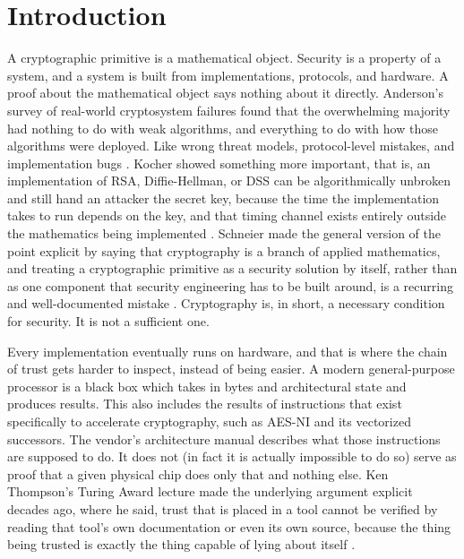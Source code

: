 \documentclass[11pt]{article}
\begin{document}
\newpage

\tableofcontents

\newpage

\section{Introduction}

A cryptographic primitive is a mathematical object. Security is a
property of a system, and a system is built from implementations,
protocols, and hardware. A proof about the mathematical object says
nothing about it directly. Anderson's survey of real-world cryptosystem
failures found that the overwhelming majority had nothing to do with weak
algorithms, and everything to do with how those algorithms were deployed.
Like wrong threat models, protocol-level mistakes, and implementation bugs
\cite{anderson1993}. Kocher showed something more important, that is, an
implementation of RSA, Diffie-Hellman, or DSS can be algorithmically
unbroken and still hand an attacker the secret key, because the time the
implementation takes to run depends on the key, and that timing channel
exists entirely outside the mathematics being implemented
\cite{kocher1996}. Schneier made the general version of the point
explicit by saying that cryptography is a branch of applied mathematics, and treating a
cryptographic primitive as a security solution by itself, rather than as
one component that security engineering has to be built around, is a
recurring and well-documented mistake \cite{schneier1998}. Cryptography
is, in short, a necessary condition for security. It is not a sufficient
one.

Every implementation eventually runs on hardware, and that is where the
chain of trust gets harder to inspect, instead of being easier. A modern
general-purpose processor is a black box which takes in bytes and
architectural state and produces results. This also includes the results of
instructions that exist specifically to accelerate cryptography, such as
AES-NI and its vectorized successors. The vendor's architecture manual
describes what those instructions are supposed to do. It does not (in fact it is actually impossible to do so) serve as proof that a given physical chip does only
that and nothing else. Ken Thompson's Turing Award lecture made the
underlying argument explicit decades ago, where he said, trust that is placed in a tool
cannot be verified by reading that tool's own documentation or even its
own source, because the thing being trusted is exactly the thing capable
of lying about itself \cite{thompson1984}.
\end{document}
